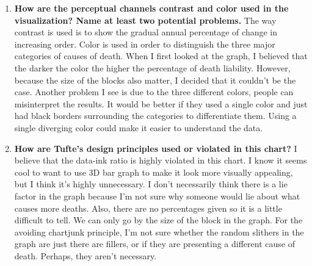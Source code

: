 \documentclass[11pt]{article}
\begin{document}
\begin{enumerate}
  
  \item \textbf{How are the perceptual channels contrast and color used in the visualization? Name at least two potential
problems.} \newline
The way contrast is used is to show the gradual annual percentage of change in increasing order. Color is used in order to distinguish the three major categories of causes of death. When I first looked at the graph, I believed that the darker the color the higher the percentage of death liability. However, because the size of the blocks also matter, I decided that it couldn't be the case. Another problem I see is due to the three different colors, people can misinterpret the results. It would be better if they used a single color and just had black borders surrounding the categories to differentiate them. Using a single diverging color could make it easier to understand the data.
  
  \item \textbf{How are Tufte's design principles used or violated in this chart?} \newline
  I believe that the data-ink ratio is highly violated in this chart. I know it seems cool to want to use 3D bar graph to make it look more visually appealing, but I think it's highly unnecessary. I don't necessarily think there is a lie factor in the graph because I'm not sure why someone would lie about what causes more deaths. Also, there are no percentages given so it is a little difficult to tell. We can only go by the size of the block in the graph. For the avoiding chartjunk principle, I'm not sure whether the random slithers in the graph are just there are fillers, or if they are presenting a different cause of death. Perhaps, they aren't necessary.
\end{enumerate}
\end{document}
